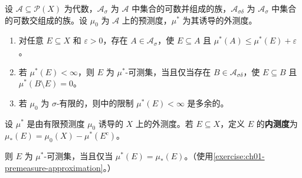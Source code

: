 \documentclass[../../main.tex]{subfiles}%
\begin{document}
\begin{exercise}\label{exercise:ch01-premeasure-approximation}
设 $\mathscr{A}\subseteq\mathscr{P}(X)$ 为代数，$\mathscr{A}_\sigma$ 为 $\mathscr{A}$ 中集合的可数并组成的族，$\mathscr{A}_{\sigma\delta}$ 为 $\mathscr{A}_\sigma$ 中集合的可数交组成的族。设 $\mu_0$ 为 $\mathscr{A}$ 上的预测度，$\mu^*$ 为其诱导的外测度。
\begin{enumerate}[label=\alph*.,ref=(\alph*)]
\item\label{item:ch01-premeasure-approximation-outer} 对任意 $E\subseteq X$ 和 $\varepsilon>0$，存在 $A\in\mathscr{A}_\sigma$，使 $E\subseteq A$ 且 $\mu^*(A)\leqslant\mu^*(E)+\varepsilon$。
\item\label{item:ch01-premeasure-approximation-hull} 若 $\mu^*(E)<\infty$，则 $E$ 为 $\mu^*$-可测集，当且仅当存在 $B\in\mathscr{A}_{\sigma\delta}$，使 $E\subseteq B$ 且 $\mu^*(B\setminus E)=0$。
\item\label{item:ch01-premeasure-approximation-sigma-finite} 若 $\mu_0$ 为 $\sigma$-有限的，则中的限制 $\mu^*(E)<\infty$ 是多余的。
\end{enumerate}
\end{exercise}

\begin{exercise}\label{exercise:ch01-inner-measure}

\begin{definition*}[内测度]
设 $\mu^*$ 是由有限预测度 $\mu_0$ 诱导的 $X$ 上的外测度。若 $E\subseteq X$，定义 $E$ 的\textbf{内测度}为 $\mu_*(E)=\mu_0(X)-\mu^*(E^{\mathrm{c}})$。
\end{definition*}
则 $E$ 为 $\mu^*$-可测集，当且仅当 $\mu^*(E)=\mu_*(E)$。（使用\cref{exercise:ch01-premeasure-approximation}。）
\end{exercise}
\end{document}
